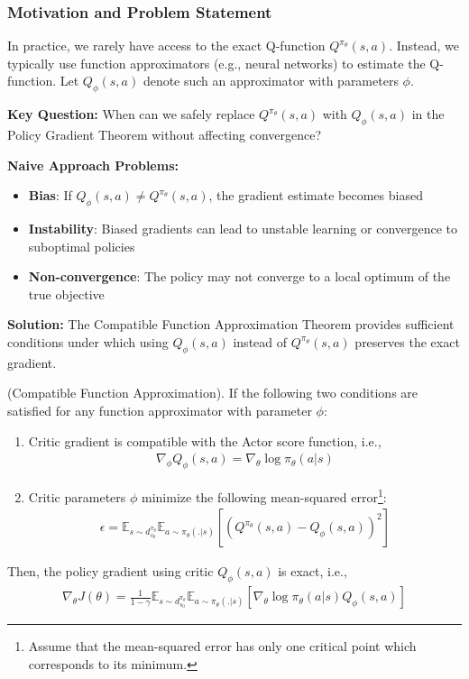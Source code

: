 \subsubsection{Motivation and Problem Statement}

In practice, we rarely have access to the exact Q-function $Q^{\pi_\theta}(s,a)$. Instead, we typically use function approximators (e.g., neural networks) to estimate the Q-function. Let $Q_{\phi}(s, a)$ denote such an approximator with parameters $\phi$.

\textbf{Key Question:} When can we safely replace $Q^{\pi_\theta}(s,a)$ with $Q_{\phi}(s,a)$ in the Policy Gradient Theorem without affecting convergence?

\textbf{Naive Approach Problems:}
\begin{itemize}
    \item \textbf{Bias}: If $Q_{\phi}(s,a) \neq Q^{\pi_\theta}(s,a)$, the gradient estimate becomes biased
    \item \textbf{Instability}: Biased gradients can lead to unstable learning or convergence to suboptimal policies
    \item \textbf{Non-convergence}: The policy may not converge to a local optimum of the true objective
\end{itemize}

\textbf{Solution:} The Compatible Function Approximation Theorem provides sufficient conditions under which using $Q_{\phi}(s,a)$ instead of $Q^{\pi_\theta}(s,a)$ preserves the exact gradient.

\begin{theorem}\label{thm:compatible_approximator}
    (Compatible Function Approximation). If the following two conditions are satisfied for any function approximator with parameter $\phi$:
    \begin{enumerate}
        \item Critic gradient is compatible with the Actor score function, i.e., 
        \begin{align*}
            \nabla_{\phi} Q_\phi(s, a) = \nabla_\theta \log \pi_\theta (a|s)
        \end{align*}
        \item Critic parameters $\phi$ minimize the following mean-squared error\footnote{Assume that the mean-squared error has only one critical point which corresponds to its minimum.}: 
        \begin{align*}
            \epsilon = \mathbb{E}_{s \sim d^{\pi_\theta}_{s_0}}\mathbb{E}_{a \sim \pi_\theta(.|s)} [(Q^{\pi_\theta} (s, a) - Q_\phi(s, a))^2]
        \end{align*}
    \end{enumerate}
    Then, the policy gradient using critic $Q_\phi(s, a)$ is exact, i.e., 
    \begin{align*}
            \nabla_\theta J(\theta) = \frac{1}{1-\gamma}\mathbb{E}_{s \sim d^{\pi_\theta}_{s_0}}\mathbb{E}_{a \sim \pi_\theta(.|s)} [\nabla_\theta \log \pi_\theta (a|s) Q_\phi (s, a)]
    \end{align*}
\end{theorem}

